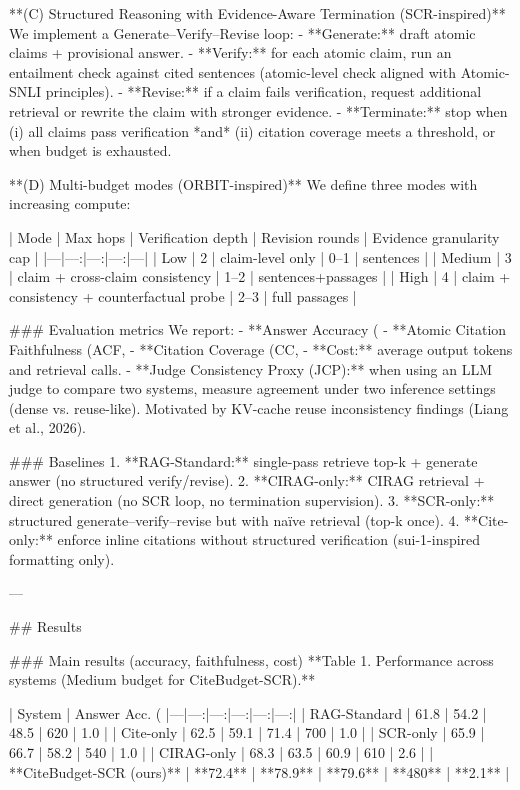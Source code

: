 **(C) Structured Reasoning with Evidence-Aware Termination (SCR-inspired)**  
We implement a Generate–Verify–Revise loop:  
- **Generate:** draft atomic claims + provisional answer.  
- **Verify:** for each atomic claim, run an entailment check against cited sentences (atomic-level check aligned with Atomic-SNLI principles).  
- **Revise:** if a claim fails verification, request additional retrieval or rewrite the claim with stronger evidence.  
- **Terminate:** stop when (i) all claims pass verification *and* (ii) citation coverage meets a threshold, or when budget is exhausted.

**(D) Multi-budget modes (ORBIT-inspired)**  
We define three modes with increasing compute:  

| Mode | Max hops | Verification depth | Revision rounds | Evidence granularity cap |
|---|---:|---:|---:|---|
| Low | 2 | claim-level only | 0–1 | sentences |
| Medium | 3 | claim + cross-claim consistency | 1–2 | sentences+passages |
| High | 4 | claim + consistency + counterfactual probe | 2–3 | full passages |

### Evaluation metrics  
We report:  
- **Answer Accuracy (%
- **Atomic Citation Faithfulness (ACF, %
- **Citation Coverage (CC, %
- **Cost:** average output tokens and retrieval calls.  
- **Judge Consistency Proxy (JCP):** when using an LLM judge to compare two systems, measure agreement under two inference settings (dense vs. reuse-like). Motivated by KV-cache reuse inconsistency findings (Liang et al., 2026).

### Baselines  
1. **RAG-Standard:** single-pass retrieve top-k + generate answer (no structured verify/revise).  
2. **CIRAG-only:** CIRAG retrieval + direct generation (no SCR loop, no termination supervision).  
3. **SCR-only:** structured generate–verify–revise but with naïve retrieval (top-k once).  
4. **Cite-only:** enforce inline citations without structured verification (sui-1-inspired formatting only).

---

## Results  

### Main results (accuracy, faithfulness, cost)  
**Table 1. Performance across systems (Medium budget for CiteBudget-SCR).**

| System | Answer Acc. (%
|---|---:|---:|---:|---:|---:|
| RAG-Standard | 61.8 | 54.2 | 48.5 | 620 | 1.0 |
| Cite-only | 62.5 | 59.1 | 71.4 | 700 | 1.0 |
| SCR-only | 65.9 | 66.7 | 58.2 | 540 | 1.0 |
| CIRAG-only | 68.3 | 63.5 | 60.9 | 610 | 2.6 |
| **CiteBudget-SCR (ours)** | **72.4** | **78.9** | **79.6** | **480** | **2.1** |

